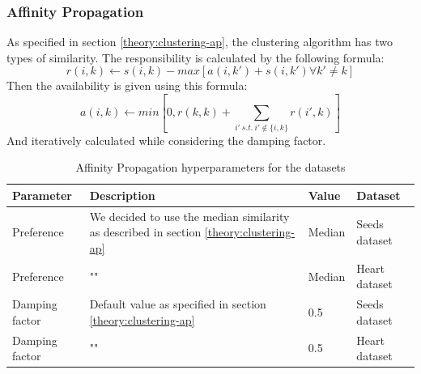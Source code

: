 \subsubsection{Affinity Propagation}
As specified in section \ref{theory:clustering-ap}, the clustering algorithm has two types of similarity.
The responsibility is calculated by the following formula:
\begin{equation}
  r(i, k) \leftarrow s(i, k) - max [ a(i, k') + s(i, k') \forall k' \neq k ]
\end{equation}
Then the availability is given using this formula:
\begin{equation}
  a(i, k) \leftarrow min [0, r(k, k) + \sum_{i'~s.t.~i' \notin \{i, k\}}{r(i', k)}]
\end{equation}
And iteratively calculated while considering the damping factor.
\begin{table}[h]
  \begin{tabular}{|l|p{6cm}|l|l|}
    \hline
    Parameter      & Description                                                                                & Value  & Dataset       \\
    \hline
    Preference     & We decided to use the median similarity as described in section \ref{theory:clustering-ap} & Median & Seeds dataset \\
    \hline
    Preference     & ""                                                                                         & Median & Heart dataset \\
    \hline

    Damping factor & Default value as specified in section \ref{theory:clustering-ap}                           & 0.5    & Seeds dataset \\
    \hline
    Damping factor & ""                                                                                         & 0.5    & Heart dataset \\
    \hline
  \end{tabular}
  \caption{Affinity Propagation hyperparameters for the datasets}
  \label{tab:ap-formula-sklearn}
\end{table}
